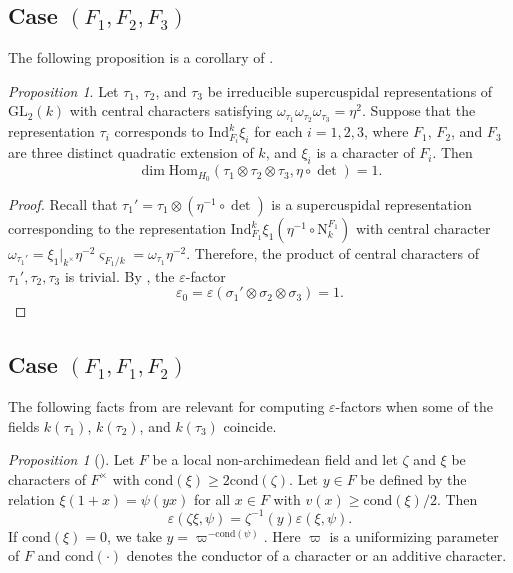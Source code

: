 \documentclass[12pt]{amsart}
\newcommand{\GL}{{\mathrm{GL}}}
\newcommand{\Hom}{{\mathrm{Hom}}}
\theoremstyle{Theorem}
\theoremstyle{Theorem}
\theoremstyle{Theorem}
\theoremstyle{Theorem}
\theoremstyle{Plain}
\theoremstyle{remark}
\theoremstyle{remark}
\theoremstyle{Definition}
\newtheorem{prpd}[dfn]{Proposition}
\begin{document}
\subsection{Case $(F_1,F_2,F_3)$}

The following proposition is a corollary of \cite[Proposition 8.7]{Prasad}.
    
\begin{prpd}
    \label{cr1}
    Let $\tau_1$, $\tau_2$, and $\tau_3$ be irreducible supercuspidal representations of $\GL_2(k)$ with central characters satisfying $ \omega_{ \tau_1 } \omega_{ \tau_2 } \omega_{ \tau_3 } = \eta^2 $. Suppose that the representation $\tau_i$ corresponds to $ \mathrm{Ind}^k_{ F_i } \xi_i $ for each $ i = 1, 2, 3 $, where $F_1$, $F_2$, and $F_3$ are three distinct quadratic extension of $k$, and $\xi_i$ is a character of $F_i$. Then 
    \[
        \dim \Hom_{ H_0 } \left( \tau_1 \otimes \tau_2 \otimes \tau_3 , \eta \circ \det \right) = 1.
    \]
\end{prpd}

\begin{proof}
    Recall that $ \tau_1' = \tau_1 \otimes \left( \eta^{-1} \circ \det \right) $ is a supercuspidal representation corresponding to the representation $ \mathrm{Ind}^k_{ F_1 } \xi_1 \left( \eta^{-1} \circ \mathrm{N}^{ F_1 }_k \right) $ with central character $ \omega_{ \tau_1' } = \xi_1|_{ k^\times } \eta^{-2} \varsigma_{ F_1/k } = \omega_{ \tau_1 } \eta^{-2} $. Therefore, the product of central characters of $\tau_1', \tau_2, \tau_3$ is trivial. By \cite[Proposition 8.7]{Prasad}, the $\varepsilon$-factor
    \[
        \varepsilon_0 = \varepsilon( \sigma_{1}' \otimes \sigma_2 \otimes \sigma_3 ) = 1.
    \]
\end{proof}

\subsection{Case $(F_1,F_1,F_2)$}

The following facts from \cite{Tunnell} are relevant for computing $\varepsilon$-factors when some of the fields $ k( \tau_1 ) $, $ k( \tau_2 ) $, and $ k( \tau_3 ) $ coincide.
    
\begin{prpd}[{\cite[Theorem 1.2]{Tunnell}}]
    \label{t 1.2}
    Let $F$ be a local non-archimedean field and let $\zeta$ and $\xi$ be characters of $F^\times$ with $ \mathrm{cond} ( \xi ) \ge2 \mathrm{cond} ( \zeta ) $. Let $ y \in F $ be defined by the relation $ \xi(1 + x) = \psi(yx) $ for all $ x \in F $ with $ v(x) \ge \mathrm{cond} ( \xi ) / 2 $. Then 
    \[
        \varepsilon ( \zeta \xi, \psi ) = \zeta^{-1} (y) \varepsilon( \xi, \psi).
    \]
    If $ \mathrm{cond} ( \xi ) = 0 $, we take $ y = \varpi^{ -\mathrm{cond} ( \psi ) } $. Here $\varpi$ is a uniformizing parameter of $F$ and $ \mathrm{cond} ( \cdot ) $ denotes the conductor of a character or an additive character.
\end{prpd}
    
\end{document}
